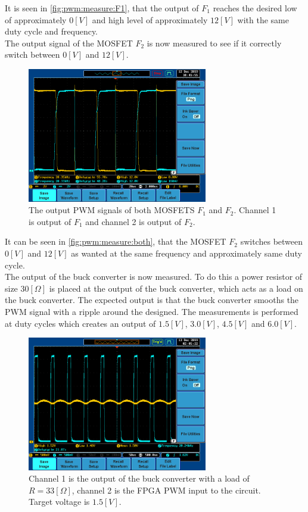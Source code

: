 \documentclass[../report.tex]{subfiles}
\begin{document}
It is seen in \autoref{fig:pwm:measure:F1}, that the output of $F_1$ reaches the desired low of approximately $0 [V]$ and high level of approximately $12 [V]$ with the same duty cycle and frequency.\\
The output signal of the MOSFET $F_2$ is now measured to see if it correctly switch between $0 [V]$ and $12 [V]$.
\begin{figure}[H]
    \centering
         \includegraphics[width=0.7\textwidth]{figures/measurements/BOTH_mosfets.PNG}
     \caption{The output PWM signals of both MOSFETS $F_1$ and $F_2$. Channel 1 is output of $F_1$ and channel 2 is output of $F_2$.}
     \label{fig:pwm:measure:both}
\end{figure}
It can be seen in \autoref{fig:pwm:measure:both}, that the MOSFET $F_2$ switches between $0 [V]$ and $12 [V]$ as wanted at the same frequency and approximately same duty cycle.\\
The output of the buck converter is now measured. To do this a power resistor of size $30 [\Omega]$ is placed at the output of the buck converter, which acts as a load on the buck converter. The expected output is that the buck converter smooths the PWM signal with a ripple around the designed. The measurements is performed at duty cycles which creates an output of $1.5 [V]$, $3.0 [V]$, $4.5 [V]$ and $6.0 [V]$.
\begin{figure}[H]
    \centering
         \includegraphics[width=0.7\textwidth]{figures/measurements/1_5_V_BOTH_PWRES.PNG}
     \caption{Channel 1 is the output of the buck converter with a load of $R = 33 [\Omega]$, channel 2 is the FPGA PWM input to the circuit. Target voltage is $1.5[V]$.}
     \label{fig:pwm:measure:buck_1_5}
\end{figure}
\end{document}

